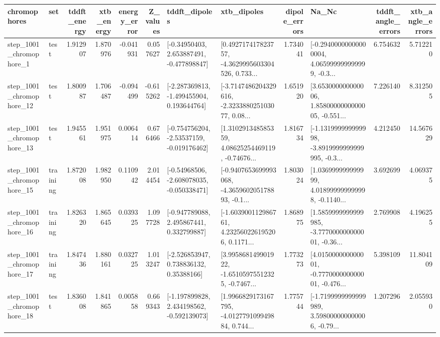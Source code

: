 \begin{tabular}{llrrrrllrlrr}
\toprule
             chromophores &       set &  tddft\_energy &  xtb\_energy &  energy\_error &  Z\_values &                               tddft\_dipoles &                                        xtb\_dipoles &  dipole\_errors &                                              Na\_Nc &  tddft\_angle\_errors &  xtb\_angle\_errors \\
\midrule
  step\_1001\_chromophore\_1 &      test &      1.912907 &    1.870976 &     -0.041931 &  0.057627 &    [-0.34950403, 2.653887491, -0.477898847] &  [0.492717417823757, -4.3629995603304526, 0.733... &       1.734041 &  [-0.29400000000000004, 4.065999999999999, -0.3... &            6.754632 &          5.712210 \\
 step\_1001\_chromophore\_12 &      test &      1.800987 &    1.706487 &     -0.094499 & -0.615262 &   [-2.287369813, -1.499455904, 0.193644764] &  [-3.7147486204329616, -2.323388025103077, 0.08... &       1.651920 &  [3.653000000000006, 1.8580000000000005, -0.551... &            7.226140 &          8.312505 \\
 step\_1001\_chromophore\_13 &      test &      1.945561 &    1.951975 &      0.006414 &  0.676466 &   [-0.754756204, -2.53537159, -0.019176462] &  [1.310291348585359, 4.08625254469119, -0.74676... &       1.816734 &  [-1.131999999999998, -3.8919999999999995, -0.3... &            4.212450 &         14.567629 \\
 step\_1001\_chromophore\_15 &  training &      1.872008 &    1.982950 &      0.110942 &  2.014454 &   [-0.54968506, -2.608078035, -0.050338471] &  [-0.9407653699993068, -4.365960205178893, -0.1... &       1.803024 &  [1.036999999999999, 4.018999999999998, -0.1140... &            3.692699 &          4.069375 \\
 step\_1001\_chromophore\_16 &  training &      1.826320 &    1.865645 &      0.039325 &  1.097728 &    [-0.947789088, 2.495867441, 0.332799887] &  [-1.603900112986761, 4.232560226195206, 0.1171... &       1.868975 &  [1.5859999999999985, -3.777000000000001, -0.36... &            2.769908 &          4.196255 \\
 step\_1001\_chromophore\_17 &  training &      1.847436 &    1.880161 &      0.032725 &  1.013247 &     [-2.526853947, 0.738836132, 0.35388166] &  [3.995868149901922, -1.65105975512325, -0.7467... &       1.773273 &  [4.015000000000001, -0.777000000000001, -0.476... &            5.398109 &         11.804109 \\
 step\_1001\_chromophore\_18 &      test &      1.836008 &    1.841865 &      0.005858 &  0.669343 &   [-1.197899828, 2.434198562, -0.592139073] &  [1.9966829173167795, -4.012779109949884, 0.744... &       1.775744 &  [-1.7199999999999989, 3.598000000000006, -0.79... &            1.207296 &          2.055930 \\

\end{tabular}
